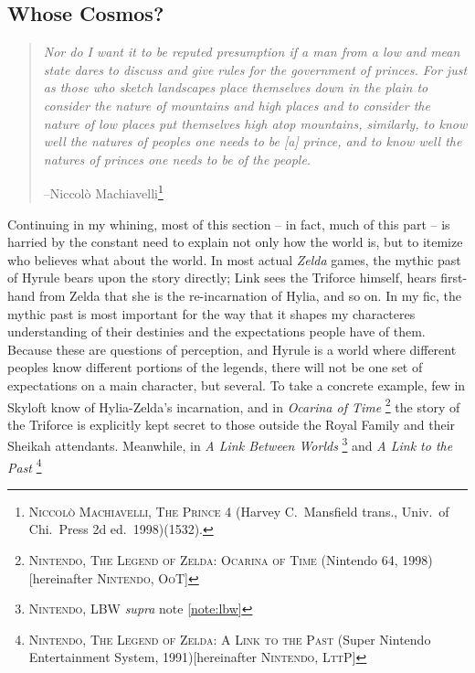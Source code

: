\documentclass[../FGP.tex]{subfiles}
\begin{document}
\subsection{Whose Cosmos?}
  \begin{quote}
  \textit{Nor do I want it to be reputed presumption if a man from a low and mean state dares to discuss and give rules for the government of princes. For just as those who sketch landscapes place themselves down in the plain to consider the nature of mountains and high places and to consider the nature of low places put themselves high atop mountains, similarly, to know well the natures of peoples one needs to be [a] prince, and to know well the natures of princes one needs to be of the people.}

  \hfill--Niccolò Machiavelli\footnote{\label{note:prince}\textsc{Niccolò Machiavelli, The Prince} 4 (Harvey C.~Mansfield trans., Univ.~of Chi.~Press 2d ed.~1998)(1532).}
  \end{quote}
Continuing in my whining, most of this section -- in fact, much of this part -- is harried by the constant need to explain not only how the world is, but to itemize who believes what about the world. 
In most actual \emph{Zelda} games, the mythic past of Hyrule bears upon the story directly; Link sees the Triforce himself, hears first-hand from Zelda that she is the re-incarnation of Hylia, and so on. In my fic, the mythic past is most important for the way that it shapes my characteres understanding of their destinies and the expectations people have of them. Because these are questions of perception, and Hyrule is a world where different peoples know different portions of the legends, there will not be one set of expectations on a main character, but several. To take a concrete example, few in Skyloft know of Hylia-Zelda's incarnation, and in \emph{Ocarina of Time}%
  \footnote{\textsc{Nintendo, The Legend of Zelda: Ocarina of Time} (Nintendo 64, 1998)[hereinafter \textsc{Nintendo, OoT}]\label{note:oot}}
the story of the Triforce is explicitly kept secret to those outside the Royal Family and their Sheikah attendants. Meanwhile, in \emph{A Link Between Worlds}%
    \footnote{\textsc{Nintendo, LBW} \textit{supra} note \ref{note:lbw}}
and \emph{A Link to the Past}%
  \footnote{\textsc{Nintendo, The Legend of Zelda: A Link to the Past} (Super Nintendo Entertainment System, 1991)[hereinafter \textsc{Nintendo, LttP}\label{note:lttp}]}
\end{document}
